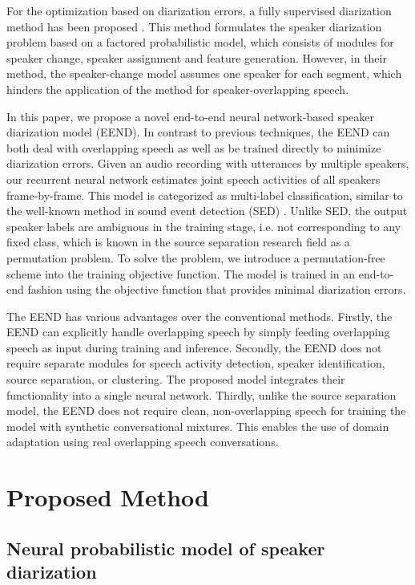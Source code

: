 \documentclass[a4paper]{article}
\begin{document}
For the optimization based on diarization errors, a fully supervised diarization method has been proposed \cite{Zhang2018}.
This method formulates the speaker diarization problem based on a factored probabilistic model, which consists of modules for speaker change, speaker assignment and feature generation.
However, in their method, the speaker-change model assumes one speaker for each segment, which hinders the application of the method for speaker-overlapping speech.

In this paper, 
we propose a novel end-to-end neural network-based speaker diarization model (EEND). In contrast to previous techniques, the EEND can both deal with overlapping speech as well as be trained directly to minimize diarization errors.
Given an audio recording with utterances by multiple speakers, our recurrent neural network estimates joint speech activities of all speakers frame-by-frame.
This model is categorized as multi-label classification, similar to the well-known method in sound event detection (SED) \cite{Adavanne2017}.
Unlike SED, the output speaker labels are ambiguous in the training stage, i.e. not corresponding to any fixed class, which is known in the source separation research field as a permutation problem.
To solve the problem, we introduce a permutation-free scheme \cite{Hershey2016, Yu2017} into the training objective function.
The model is trained in an end-to-end fashion using the objective function that provides minimal diarization errors.

The EEND has various advantages over the conventional methods.
Firstly, the EEND can explicitly handle overlapping speech by simply feeding overlapping speech as input during training and inference.
Secondly, the EEND does not require separate modules for speech activity detection, speaker identification, source separation, or clustering.
The proposed model integrates their functionality into a single neural network.
Thirdly, unlike the source separation model, the EEND does not require clean, non-overlapping speech for training the model with synthetic conversational mixtures.
This enables the use of domain adaptation using real overlapping speech conversations.
\section{Proposed Method}

\subsection{Neural probabilistic model of speaker diarization}
\end{document}
